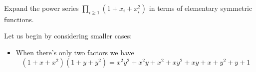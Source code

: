 \documentclass[12pt]{memoir}
\begin{document}
\begin{Ej}
 Expand the power series $\prod_{i\geq 1}(1+x_i+x_i^2)$ in terms of elementary symmetric functions.
\end{Ej}

\begin{ptcbr}
Let us begin by considering smaller cases:
\begin{itemize}
    \itemsep=-0.4em
    \item When there's only two factors we have 
$$(1+x+x^2)(1+y+y^2)=x^2 y^2 + x^2 y + x^2 + x y^2 + x y + x + y^2 + y + 1$$
\end{itemize}
\end{ptcbr}
\end{document}
